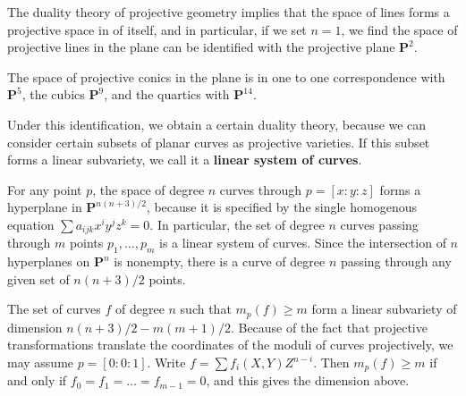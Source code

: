 \begin{example}
    The duality theory of projective geometry implies that the space of lines forms a projective space in of itself, and in particular, if we set $n = 1$, we find the space of projective lines in the plane can be identified with the projective plane $\mathbf{P}^2$.
\end{example}

\begin{example}
    The space of projective conics in the plane is in one to one correspondence with $\mathbf{P}^5$, the cubics $\mathbf{P}^9$, and the quartics with $\mathbf{P}^{14}$.
\end{example}

Under this identification, we obtain a certain duality theory, because we can consider certain subsets of planar curves as projective varieties. If this subset forms a linear subvariety, we call it a {\bf linear system of curves}.

\begin{example}
    For any point $p$, the space of degree $n$ curves through $p = [x:y:z]$ forms a hyperplane in $\mathbf{P}^{n(n+3)/2}$, because it is specified by the single homogenous equation $\sum a_{ijk}x^iy^jz^k = 0$. In particular, the set of degree $n$ curves passing through $m$ points $p_1, \dots, p_m$ is a linear system of curves. Since the intersection of $n$ hyperplanes on $\mathbf{P}^n$ is nonempty, there is a curve of degree $n$ passing through any given set of $n(n+3)/2$ points.
\end{example}

\begin{example}
    The set of curves $f$ of degree $n$ such that $m_p(f) \geq m$ form a linear subvariety of dimension $n(n+3)/2 - m(m+1)/2$. Because of the fact that projective transformations translate the coordinates of the moduli of curves projectively, we may assume $p = [0:0:1]$. Write $f = \sum f_i(X,Y)Z^{n-i}$. Then $m_p(f) \geq m$ if and only if $f_0 = f_1 = \dots = f_{m-1} = 0$, and this gives the dimension above.
\end{example}

